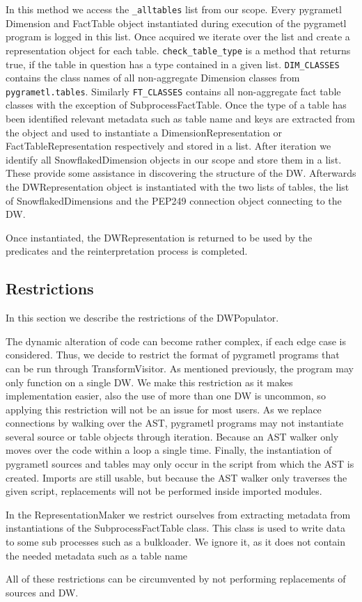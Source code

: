 In this method we access the \texttt{\_alltables} list from our scope. Every pygrametl Dimension and FactTable object instantiated during execution of the pygrametl program is logged in this list. Once acquired we iterate over the list and create a representation object for each table. \texttt{check\_table\_type} is a method that returns true, if the table in question has a type contained in a given list. \texttt{DIM\_CLASSES} contains the class names of all non-aggregate Dimension classes from \texttt{pygrametl.tables}. Similarly \texttt{FT\_CLASSES} contains all non-aggregate fact table classes with the exception of SubprocessFactTable. Once the type of a table has been identified relevant metadata such as table name and keys are extracted from the object and used to instantiate a DimensionRepresentation or FactTableRepresentation respectively and stored in a list. After iteration we identify all SnowflakedDimension objects in our scope and store them in a list. These provide some assistance in discovering the structure of the DW. Afterwards the DWRepresentation object is instantiated with the two lists of tables, the list of SnowflakedDimensions and the PEP249 connection object connecting to the DW.

Once instantiated, the DWRepresentation is returned to be used by the predicates and the reinterpretation process is completed.

\subsection{Restrictions}
In this section we describe the restrictions of the DWPopulator. 

The dynamic alteration of code can become rather complex, if each edge case is considered. Thus, we decide to restrict the format of pygrametl programs that can be run through TransformVisitor. As mentioned previously, the program may only function on a single DW. We make this restriction as it makes implementation easier, also the use of more than one DW is uncommon, so applying this restriction will not be an issue for most users. As we replace connections by walking over the AST, pygrametl programs may not instantiate several source or table objects through iteration. Because an AST walker only moves over the code within a loop a single time. Finally, the instantiation of pygrametl sources and tables may only occur in the script from which the AST is created. Imports are still usable, but because the AST walker only traverses the given script, replacements will not be performed inside imported modules.

In the RepresentationMaker we restrict ourselves from extracting metadata from instantiations of the SubprocessFactTable class. This class is used to write data to some sub processes such as a bulkloader. We ignore it, as it does not contain the needed metadata such as a table name

 All of these restrictions can be circumvented by not performing replacements of sources and DW. 

